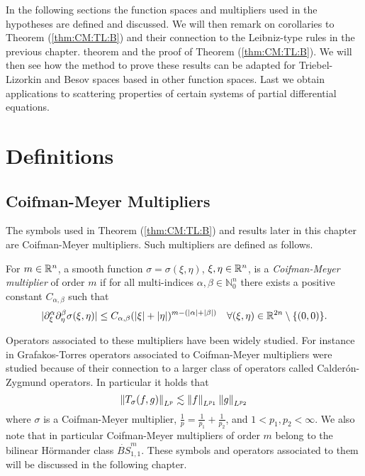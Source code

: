 In the following sections the function spaces and multipliers used in the hypotheses are defined and discussed. We will then remark on corollaries to Theorem (\ref{thm:CM:TL:B}) and their connection to the Leibniz-type rules in the previous chapter.  theorem and the proof of Theorem (\ref{thm:CM:TL:B}). We will then see how the method to prove these results can be adapted for Triebel-Lizorkin and Besov spaces based in other function spaces. Last we obtain applications to scattering properties of certain systems of partial differential equations. 

\section{Definitions}

\subsection{Coifman-Meyer Multipliers}

The symbols used in Theorem (\ref{thm:CM:TL:B}) and results later in this chapter are Coifman-Meyer multipliers. Such multipliers are defined as follows.

\begin{dfn}\label{CM_def}
For $m\in{{\mathbb R}^n}$, a smooth function $\sigma = \sigma(\xi,\eta)$, $\xi,\eta\in{{\mathbb R}^n}$, is a \textit{Coifman-Meyer multiplier} of order $m$ if for all multi-indices $\alpha,\beta\in\mathbb{N}^n_0$ there exists a positive constant $C_{\alpha,\beta}$ such that 
\begin{equation}\label{eq:CMm}
|\partial_\xi^\alpha \partial_\eta^\beta \sigma(\xi, \eta)| \leq C_{\alpha, \beta} (|\xi|+|\eta|)^{m -(\left\vert \alpha \right\vert+ \left\vert \beta \right\vert)} \quad \forall (\xi, \eta) \in \mathbb{R}^{2n} \setminus \{(0,0)\}.
\end{equation}
\end{dfn}
Operators associated to these multipliers have been widely studied. For instance in Grafakos-Torres \cite{MR1880324} operators associated to Coifman-Meyer multipliers were studied because of their connection to a larger class of operators called Calder\'on-Zygmund operators. In particular it holds that 
\[ \left\|T_\sigma(f,g)\right\|_{L^p}\lesssim \left\|f\right\|_{L^{p_1}}\left\|g\right\|_{L^{p_2}} \]
where $\sigma$ is a Coifman-Meyer multiplier, $\frac{1}{p} = \frac{1}{p_1} + \frac{1}{p_2}$, and $1<p_1,p_2<\infty$. 
We also note that in particular Coifman-Meyer multipliers of order $m$ belong to the bilinear H\"ormander class $\dot{BS}^m_{1,1}$. These symbols and operators associated to them will be discussed in the following chapter. 

